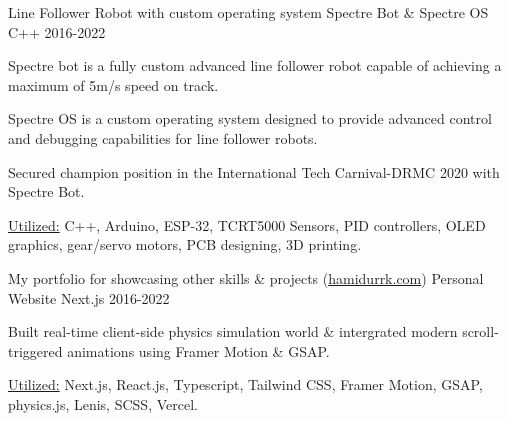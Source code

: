 \begin{cventries}
      \cventryprojects
      {Line Follower Robot with custom operating system} %
      {Spectre Bot \& Spectre OS} %
      {C++} %
      {2016-2022} %
      {
        \begin{cvitems} %
          \item {Spectre bot is a fully custom advanced line 
          follower robot capable of achieving a maximum of 5m/s speed on track.}
          \item {Spectre OS is a custom operating system designed to provide advanced control and 
          debugging capabilities for line follower robots.}
          \item {Secured champion position in the International Tech Carnival-DRMC 2020 with Spectre Bot.}
          \item {\underline{Utilized:} C++, Arduino, ESP-32, TCRT5000 Sensors, PID controllers, OLED graphics, gear/servo motors, PCB designing, 3D printing.}
        \end{cvitems}
        }
        
      \cventryprojects
      {My portfolio for showcasing other skills \& projects (\href{https://hamidurrk.com}{hamidurrk.com})} %
      {Personal Website} %
      {Next.js} %
      {2016-2022} %
      {
        \begin{cvitems}
          \item {Built real-time client-side physics simulation world \& intergrated modern scroll-triggered animations using Framer Motion \& GSAP.}
          \item {\underline{Utilized:} Next.js, React.js, Typescript, Tailwind CSS, Framer Motion, GSAP, physics.js, Lenis, SCSS, Vercel.}
        \end{cvitems}
        }
\end{cventries}
